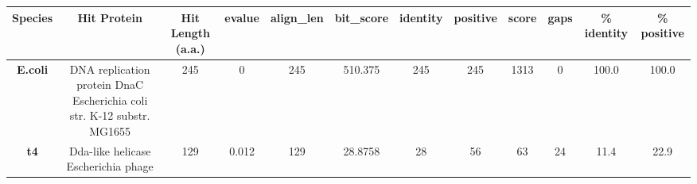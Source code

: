 \begin{tabular}{|c|c|c|c|c|c|c|c|c|c|c|c|} \hline
\textbf{Species} & \textbf{Hit Protein} & \textbf{Hit Length (a.a.)} & \textbf{evalue} & \textbf{align\_len} & \textbf{bit\_score} & \textbf{identity} & \textbf{positive} & \textbf{score} & \textbf{gaps} & \textbf{\% identity} & \textbf{\% positive} \\ \hline
\textbf{E.coli} & DNA replication protein DnaC Escherichia coli str. K-12 substr. MG1655 & 245 & 0 & 245 & 510.375 & 245 & 245 & 1313 & 0 & 100.0 & 100.0\\
\textbf{t4} & Dda-like helicase Escherichia phage  & 129 & 0.012 & 129 & 28.8758 & 28 & 56 & 63 & 24 & 11.4 & 22.9\\
\hline \end{tabular}
